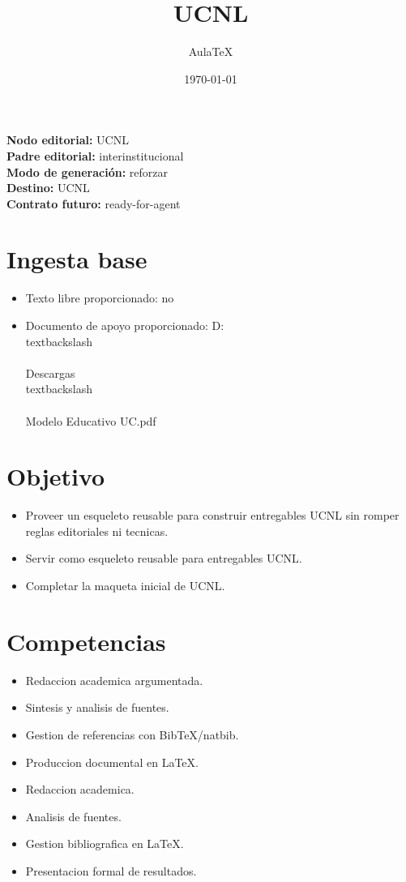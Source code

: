 \documentclass[12pt]{article}
\title{UCNL}
\author{AulaTeX}
\date{\today}
\begin{document}
\maketitle

\noindent\textbf{Nodo editorial:} UCNL\\
\textbf{Padre editorial:} interinstitucional\\
\textbf{Modo de generación:} reforzar\\
\textbf{Destino:} UCNL\\
\textbf{Contrato futuro:} ready-for-agent

\section*{Ingesta base}
\begin{itemize}[leftmargin=*]
  \item Texto libre proporcionado: no
  \item Documento de apoyo proporcionado: D:\\textbackslash\\{\\}Descargas\\textbackslash\\{\\}Modelo Educativo UC.pdf
\end{itemize}

\section*{Objetivo}
\begin{itemize}[leftmargin=*]
  \item Proveer un esqueleto reusable para construir entregables UCNL sin romper reglas editoriales ni tecnicas.
  \item Servir como esqueleto reusable para entregables UCNL.
  \item Completar la maqueta inicial de UCNL.
\end{itemize}

\section*{Competencias}
\begin{itemize}[leftmargin=*]
  \item Redaccion academica argumentada.
  \item Sintesis y analisis de fuentes.
  \item Gestion de referencias con BibTeX/natbib.
  \item Produccion documental en LaTeX.
  \item Redaccion academica.
  \item Analisis de fuentes.
  \item Gestion bibliografica en LaTeX.
  \item Presentacion formal de resultados.
\end{itemize}
\end{document}

